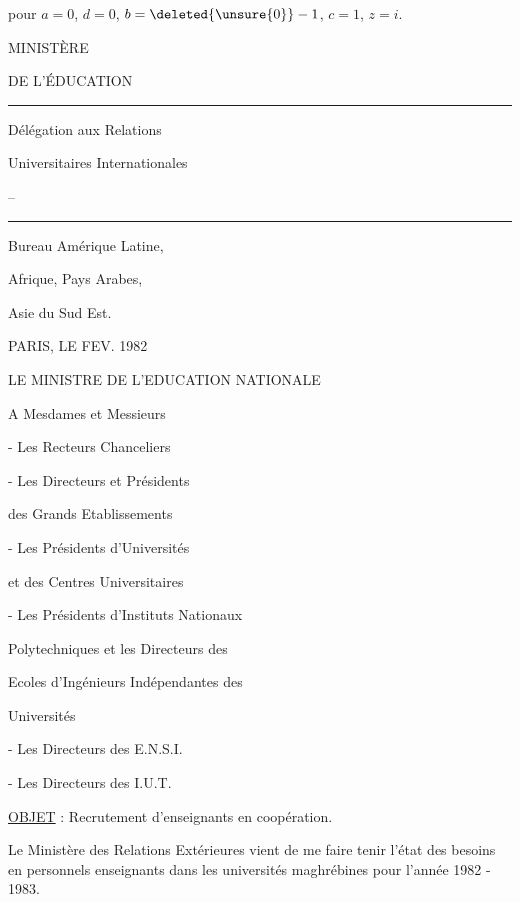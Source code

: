 pour $a=0$,  $d=0$, $b=\deleted{\unsure{0}}-1$, $c=1$, $z=i$.

MINISTÈRE\par DE L'ÉDUCATION\par\rule{9mm}{.4pt}

Délégation aux Relations\par Universitaires Internationales\par --\par\rule{10mm}{.4pt}

Bureau Amérique Latine,\par Afrique, Pays Arabes,\par Asie du Sud Est.

PARIS, LE FEV. 1982

LE MINISTRE DE L'EDUCATION NATIONALE

A Mesdames et Messieurs

- Les Recteurs Chanceliers\par
- Les Directeurs et Présidents\par des Grands Etablissements\par
- Les Présidents d'Universités\par et des Centres Universitaires\par
- Les Présidents d'Instituts Nationaux\par Polytechniques et les Directeurs des\par Ecoles d'Ingénieurs Indépendantes des\par Universités\par
- Les Directeurs des E.N.S.I.\par
- Les Directeurs des I.U.T.


\uline{OBJET} : Recrutement d'enseignants en coopération.

Le Ministère des Relations Extérieures vient de me faire tenir l'état des besoins en personnels enseignants dans les universités maghrébines pour l'année 1982 - 1983.

